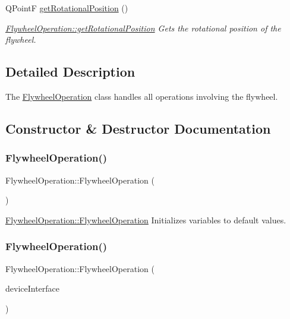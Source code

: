 \begin{DoxyCompactItemize}
Q\+PointF \hyperlink{class_flywheel_operation_a0e1ba213763760cf0128dfdc8436cfdf}{get\+Rotational\+Position} ()
\begin{DoxyCompactList}\small\item\em \hyperlink{class_flywheel_operation_a0e1ba213763760cf0128dfdc8436cfdf}{Flywheel\+Operation\+::get\+Rotational\+Position} Gets the rotational position of the flywheel. \end{DoxyCompactList}\end{DoxyCompactItemize}


\subsection{Detailed Description}
The \hyperlink{class_flywheel_operation}{Flywheel\+Operation} class handles all operations involving the flywheel. 

\subsection{Constructor \& Destructor Documentation}
\hypertarget{class_flywheel_operation_a4735eb5ddf58ba1d0bf93e37a2885c76}{}\label{class_flywheel_operation_a4735eb5ddf58ba1d0bf93e37a2885c76} 
\subsubsection{\texorpdfstring{Flywheel\+Operation()}{FlywheelOperation()}\hspace{0.1cm}{\footnotesize\ttfamily [1/2]}}
{\footnotesize\ttfamily Flywheel\+Operation\+::\+Flywheel\+Operation (\begin{DoxyParamCaption}{ }\end{DoxyParamCaption})}



\hyperlink{class_flywheel_operation_a4735eb5ddf58ba1d0bf93e37a2885c76}{Flywheel\+Operation\+::\+Flywheel\+Operation} Initializes variables to default values. 

\hypertarget{class_flywheel_operation_aca3144bf0bb443aaa8a2779624d2a5b2}{}\label{class_flywheel_operation_aca3144bf0bb443aaa8a2779624d2a5b2} 
\subsubsection{\texorpdfstring{Flywheel\+Operation()}{FlywheelOperation()}\hspace{0.1cm}{\footnotesize\ttfamily [2/2]}}
{\footnotesize\ttfamily Flywheel\+Operation\+::\+Flywheel\+Operation (\begin{DoxyParamCaption}\item[{\hyperlink{class_common_device_interface}{Common\+Device\+Interface} $\ast$}]{device\+Interface }\end{DoxyParamCaption})}



